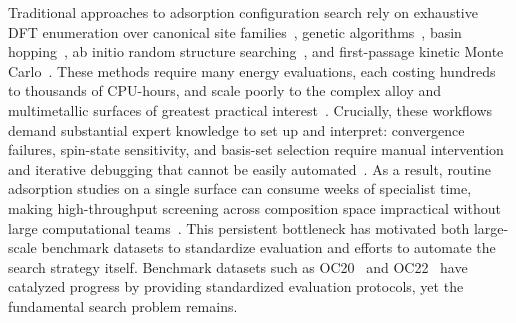 Traditional approaches to adsorption configuration search rely on exhaustive DFT enumeration over canonical site families~\cite{norskov2004density}, genetic algorithms~\cite{vilhelmsen2014genetic}, basin hopping~\cite{wales1997global}, ab initio random structure searching~\cite{pickard2011ab}, and first-passage kinetic Monte Carlo~\cite{reuter2003first}.
These methods require many energy evaluations, each costing hundreds to thousands of CPU-hours, and scale poorly to the complex alloy and multimetallic surfaces of greatest practical interest~\cite{greeley2017design}.
Crucially, these workflows demand substantial expert knowledge to set up and interpret: convergence failures, spin-state sensitivity, and basis-set selection require manual intervention and iterative debugging that cannot be easily automated~\cite{stamatakis2011first}.
As a result, routine adsorption studies on a single surface can consume weeks of specialist time, making high-throughput screening across composition space impractical without large computational teams~\cite{ulissi2017toward}.
This persistent bottleneck has motivated both large-scale benchmark datasets to standardize evaluation and efforts to automate the search strategy itself.
Benchmark datasets such as OC20~\cite{zitnick2020introduction} and OC22~\cite{tran2023oc22} have catalyzed progress by providing standardized evaluation protocols, yet the fundamental search problem remains.

